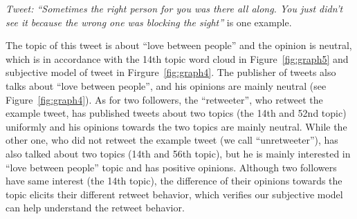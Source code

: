\documentclass{acm_proc_article-sp}
\begin{document}

\textit{Tweet: ``Sometimes the right person for you was there all along. You just didn’t see it because the wrong one was blocking the sight''} is one example.

The topic of this tweet is about ``love between people'' and the opinion is neutral, which is in accordance with the 14th topic word cloud in Figure~\ref{fig:graph5} and subjective model of tweet in Firgure~\ref{fig:graph4}.
The publisher of tweets also talks about ``love between people'', and his opinions are mainly neutral (see Figure~\ref{fig:graph4}).
As for two followers, the ``retweeter'', who retweet the example tweet, has published tweets about two topics (the 14th and 52nd topic) uniformly and his opinions towards the two topics are mainly neutral.
While the other one, who did not retweet the example tweet (we call ``unretweeter''), has also talked about two topics (14th and 56th topic), but he is mainly interested in ``love between people'' topic and has positive opinions.
Although two followers have same interest (the 14th topic), the difference of their opinions towards the topic elicits their different retweet behavior, which verifies our subjective model can help understand the retweet behavior.
\end{document}

